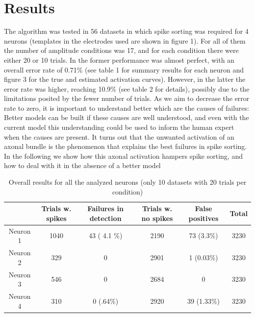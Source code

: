 \documentclass[12pt,letterpaper,fleqn]{article}
\begin{document}
    \section{Results}
    The algorithm was tested in 56 datasets in which spike sorting was required for 4 neurons (templates in the electrodes used are shown in figure 1). For all of them the number of amplitude conditions was 17, and for each condition there were either 20 or 10 trials. In the former performance was almost perfect, with an overall error rate of 0.71\% (see table 1 for summary results for each neuron and figure 3 for the true and estimated activation curves). However, in the latter the error rate was higher, reaching 10.9\% (see table 2 for details), possibly due to the limitations posited by the fewer number of trials. As we aim to decrease the error rate to zero, it is important to understand better which are the causes of failures: Better models can be built if these causes are well understood, and even with the current model this understanding could be used to inform the human expert when the causes are present. It turns out that the unwanted activation of an axonal bundle is the phenomenon that explains the best failures in spike sorting. In the following we show how this axonal activation hampers spike sorting, and how to deal with it in the absence of a better model
    \begin{table}[h!]
\begin{tabular}{|c|c|c|c|c|c|}
\hline
   &  Trials w. spikes & Failures in detection & Trials w. no spikes & False positives  & Total \\ \hline
   Neuron 1 & 1040 & 43 ( 4.1 \%)& 2190 & 73 (3.3\%) & 3230 \\ \hline
   Neuron 2 & 329 & 0 & 2901 & 1 (0.03\%)  & 3230 \\ \hline
   Neuron 3 & 546 & 0 & 2684 & 0 & 3230  \\ \hline
   Neuron 4 & 310 & 0 (.64\%) & 2920 & 39 (1.33\%) & 3230  \\
  \hline
\end{tabular}
\caption{Overall results for all the analyzed neurons (only 10 datasets with 20 trials per condition)}
\end{table}
\end{document}
